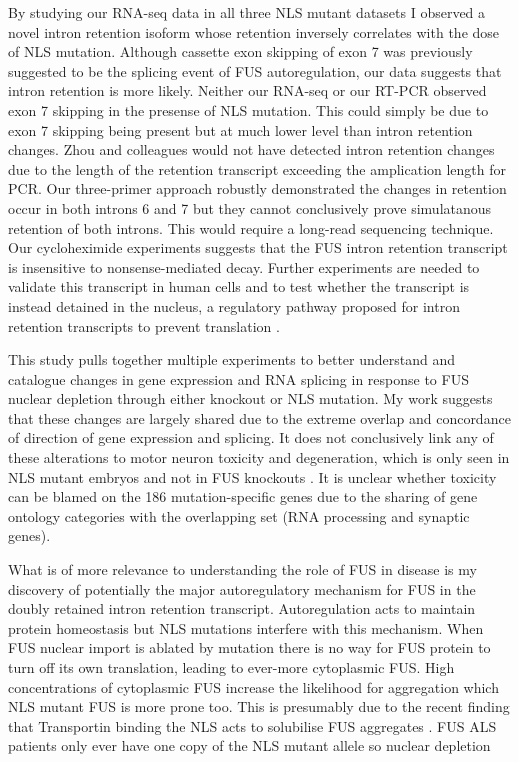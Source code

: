 By studying our RNA-seq data in all three NLS mutant datasets I observed a novel intron retention isoform whose retention inversely correlates with the dose of NLS mutation. 
Although cassette exon skipping of exon 7 was previously suggested to be the splicing event of FUS autoregulation, our data suggests that intron retention is more likely.
Neither our RNA-seq or our RT-PCR observed exon 7 skipping in the presense of NLS mutation. 
This could simply be due to exon 7 skipping being present but at much lower level than intron retention changes. 
Zhou and colleagues would not have detected intron retention changes due to the length of the retention transcript exceeding the amplication length for PCR. 
Our three-primer approach robustly demonstrated the changes in retention occur in both introns 6 and 7 but they cannot conclusively prove simulatanous retention of both introns.
This would require a long-read sequencing technique.
Our cycloheximide experiments suggests that the FUS intron retention transcript is insensitive to nonsense-mediated decay. 
Further experiments are needed to validate this transcript in human cells and to test whether the transcript is instead detained in the nucleus, a regulatory pathway proposed for intron retention transcripts to prevent translation \cite{Boutz2015}.

This study pulls together multiple experiments to better understand and catalogue changes in gene expression and RNA splicing in response to FUS nuclear depletion through either knockout or NLS mutation.
My work suggests that these changes are largely shared due to the extreme overlap and concordance of direction of gene expression and splicing.
It does not conclusively link any of these alterations to motor neuron toxicity and degeneration, which is only seen in NLS mutant embryos and not in FUS knockouts \citep{Scekic-zahirovic2016}.
It is unclear whether toxicity can be blamed on the 186 mutation-specific genes due to the sharing of gene ontology categories with the overlapping set (RNA processing and synaptic genes). 

What is of more relevance to understanding the role of FUS in disease is my discovery of potentially the major autoregulatory mechanism for FUS in the doubly retained intron retention transcript.
Autoregulation acts to maintain protein homeostasis but NLS mutations interfere with this mechanism. 
When FUS nuclear import is ablated by mutation there is no way for FUS protein to turn off its own translation, leading to ever-more cytoplasmic FUS.
High concentrations of cytoplasmic FUS increase the likelihood for aggregation which NLS mutant FUS is more prone too. This is presumably due to the recent finding that Transportin binding the NLS acts to solubilise FUS aggregates \citep{Guo2018,Yoshizawa2018,Hofweber2018}.
FUS ALS patients only ever have one copy of the NLS mutant allele so nuclear depletion 


